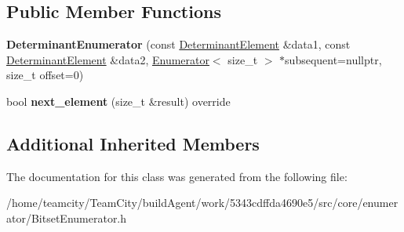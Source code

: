 \subsection*{Public Member Functions}
\begin{DoxyCompactItemize}
\item 
{\bfseries Determinant\+Enumerator} (const \hyperlink{classDeterminantElement}{Determinant\+Element} \&data1, const \hyperlink{classDeterminantElement}{Determinant\+Element} \&data2, \hyperlink{classEnumerator}{Enumerator}$<$ size\+\_\+t $>$ $\ast$subsequent=nullptr, size\+\_\+t offset=0)\hypertarget{classDeterminantEnumerator_a30c99d5c81de8d12caf012f14c1af129}{}\label{classDeterminantEnumerator_a30c99d5c81de8d12caf012f14c1af129}

\item 
bool {\bfseries next\+\_\+element} (size\+\_\+t \&result) override\hypertarget{classDeterminantEnumerator_ab3027854ee62ae607d7326f3cf65553a}{}\label{classDeterminantEnumerator_ab3027854ee62ae607d7326f3cf65553a}

\end{DoxyCompactItemize}
\subsection*{Additional Inherited Members}


The documentation for this class was generated from the following file\+:\begin{DoxyCompactItemize}
\item 
/home/teamcity/\+Team\+City/build\+Agent/work/5343cdffda4690e5/src/core/enumerator/Bitset\+Enumerator.\+h\end{DoxyCompactItemize}
